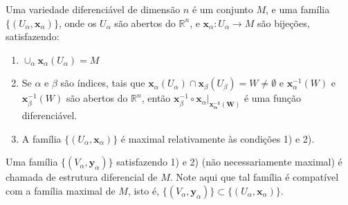 \begin{definition}
    \label{loc:2.1_:_def_1_:_variedade_diferenciável.definição}
    Uma variedade diferenciável de dimensão $n$ é um conjunto $M$, e uma família $\{ (U_{\alpha}, \mathbf{x}_{\alpha}) \}$, onde os $U_{\alpha}$ são abertos do $\mathbb{R}^{n}$, e $\mathbf{x}_{\alpha}:U_{\alpha}\to M$ são bijeções, satisfazendo:
    \begin{enumerate}
        \item $\cup_{\alpha} \mathbf{x}_{\alpha}(U_{\alpha})=M$
        \item Se $\alpha$ e $\beta$ são índices, tais que $\mathbf{x}_{\alpha}(U_{\alpha})\cap \mathbf{x}_{\beta}(U_{\beta}) = W \neq \emptyset$ e $\mathbf{x}^{-1}_{\alpha}(W)$ e $\mathbf{x}^{-1}_{\beta}(W)$ são abertos do $\mathbb{R}^{n}$, então $\mathbf{x}_{\beta}^{-1} \circ\mathbf{x}_{\alpha}|_{\mathbf{x_{\alpha}^{-1}(W)}}$ é uma função diferenciável.
        \item A família $\{ (U_{\alpha}, \mathbf{x}_{\alpha}) \}$ é maximal relativamente às condições 1) e 2).
    \end{enumerate}

    Uma família $\{ (V_{\alpha}, \mathbf{y}_{\alpha}) \}$ satisfazendo 1) e 2) (não necessariamente maximal) é chamada de estrutura diferencial de $M$. Note aqui que tal família é compatível com a família maximal de $M$, isto é, $\{ (V_{\alpha}, \mathbf{y}_{\alpha}) \} \subset\{ (U_{\alpha}, \mathbf{x}_{\alpha}) \}$.
    \begin{center}

\end{center}
\end{definition}
